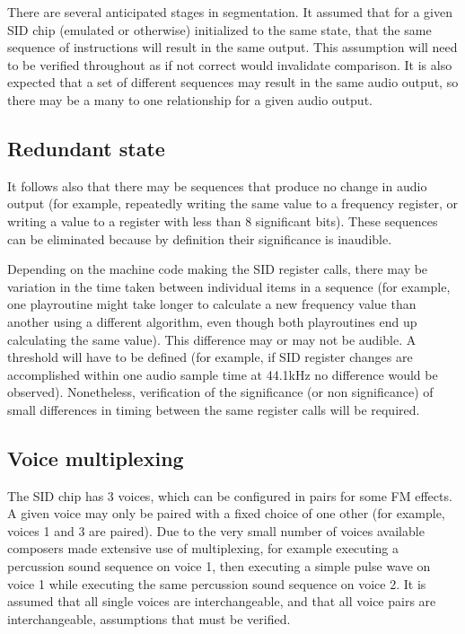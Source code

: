 \documentclass[10pt]{article}
\begin{document}
\begin{multicols*}{2}
  There are several anticipated stages in segmentation. It assumed
  that for a given SID chip (emulated or otherwise) initialized to the
  same state, that the same sequence of instructions will result in
  the same output. This assumption will need to be verified throughout
  as if not correct would invalidate comparison. It is also expected
  that a set of different sequences may result in the same audio
  output, so there may be a many to one relationship for a given audio
  output.

  \subsection{Redundant state}
  It follows also that there may be sequences that produce no change
  in audio output (for example, repeatedly writing the same value to a
  frequency register, or writing a value to a register with less than
  8 significant bits). These sequences can be eliminated because by
  definition their significance is inaudible.

  Depending on the machine code making the SID register calls, there
  may be variation in the time taken between individual items in a
  sequence (for example, one playroutine might take longer to calculate a
  new frequency value than another using a different algorithm, even
  though both playroutines end up calculating the same value). This
  difference may or may not be audible. A threshold will have to be
  defined (for example, if SID register changes are accomplished
  within one audio sample time at 44.1kHz no difference would be
  observed).  Nonetheless, verification of the significance (or non
  significance) of small differences in timing between the same
  register calls will be required.

  \subsection{Voice multiplexing}
  The SID chip has 3 voices, which can be configured in pairs for some
  FM effects. A given voice may only be paired with a fixed choice of
  one other (for example, voices 1 and 3 are paired). Due to the very
  small number of voices available composers made extensive use of
  multiplexing, for example executing a percussion sound sequence on
  voice 1, then executing a simple pulse wave on voice 1 while
  executing the same percussion sound sequence on voice 2. It is
  assumed that all single voices are interchangeable, and that all
  voice pairs are interchangeable, assumptions that must be verified.


\end{multicols*}
\end{document}
